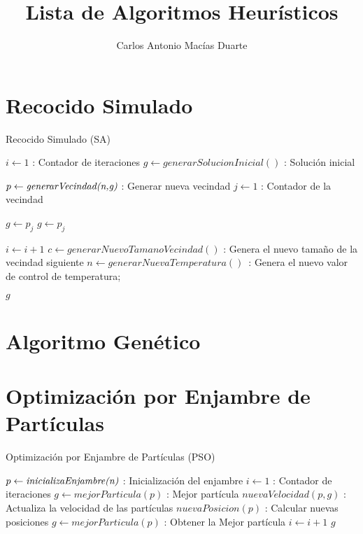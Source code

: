\documentclass[10pt,letterpaper,twoside,openright]{article}
\author{Carlos Antonio Macías Duarte}
\title{Lista de Algoritmos Heurísticos}
\begin{document}
	\maketitle
		
	\tableofcontents
	
	\section{Recocido Simulado}
	
		\begin{algorithm}[H]
			\caption{Recocido Simulado (SA)}
				$ i \leftarrow 1 $ : Contador de iteraciones\;
				$ g \leftarrow generarSolucionInicial() $ : Solución inicial\;
				{
					$ p \leftarrow \emph{generarVecindad(n,g)}$ : Generar nueva vecindad\;
					$ j \leftarrow 1 $ : Contador de la vecindad\;
					{
						{
							$ g \leftarrow p_{j} $\;
						}
						{
							$ g \leftarrow p_{j} $\;
						}
						
					}			
					$ i \leftarrow  i + 1 $\;
					$ c \leftarrow  generarNuevoTamanoVecindad() $ : Genera el nuevo tamaño de la vecindad siguiente\;
					$ n \leftarrow  generarNuevaTemperatura() $\ :  Genera el nuevo valor de control de temperatura;
				}
		 		\Return $ g $
		 \end{algorithm}
	
	\section{Algoritmo Genético}
	
	\section{Optimización por Enjambre de Partículas}
	
		\begin{algorithm}[H]
			\caption{Optimización por Enjambre de Partículas (PSO)}
				$ p \leftarrow \emph{inicializaEnjambre(n)}$ : Inicialización del enjambre\;
				$ i \leftarrow 1 $ : Contador de iteraciones\;
				$ g \leftarrow mejorParticula(p) $ : Mejor partícula\;
				{
					$ nuevaVelocidad(p,g) $ : Actualiza la velocidad de las partículas\;
					$ nuevaPosicion(p) $ : Calcular nuevas posiciones\;
					$ g \leftarrow mejorParticula(p) $ : Obtener la Mejor partícula\;
					$ i \leftarrow  i + 1 $\;
				}
		 		\Return $ g $
		 \end{algorithm}
\end{document}
